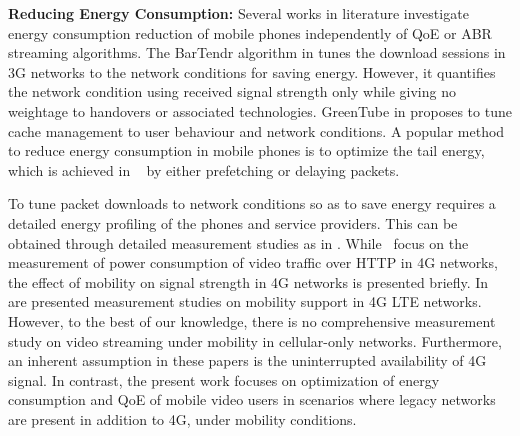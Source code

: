 \noindent\textbf{Reducing Energy Consumption:} Several works in literature investigate energy consumption reduction of mobile phones independently of QoE or ABR streaming algorithms. The BarTendr algorithm in \cite{Schulman2010}  tunes the download sessions in 3G networks to the network conditions for saving energy. However, it quantifies the network condition using received signal strength only while giving no weightage to handovers or associated technologies. GreenTube in \cite{Xin2012} proposes to tune cache management to user behaviour and network conditions. A popular method to reduce energy consumption in mobile phones is to optimize the tail energy, which is achieved in ~\cite{Yang2018} by either prefetching or delaying packets.

\indent To tune packet downloads to network conditions so as to save energy requires a detailed energy profiling of the phones and service providers. This can be obtained through detailed measurement studies as in \cite{Huang2012}. While~\cite{Zhang2018M,Zhang2016,Zhang2016DASH,Khokar2019} focus on the measurement of power consumption of video traffic over HTTP in \ac{4G} networks, the effect of  mobility on signal strength  in \ac{4G} networks is presented briefly. In~\cite{Huang2012, Deng2018} are presented  measurement studies on mobility support in \ac{4G} \ac{LTE} networks. However, to the best of our knowledge, there is no comprehensive measurement study on video streaming under mobility in cellular-only networks. Furthermore, an inherent assumption in these papers is the uninterrupted availability of 4G signal. In contrast, the present work focuses on optimization of energy consumption and \ac{QoE} of mobile video users in scenarios where legacy networks are present in addition to 4G, under mobility conditions.